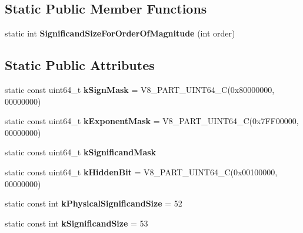 \subsection*{Static Public Member Functions}
\begin{DoxyCompactItemize}
\item 
\hypertarget{classv8_1_1internal_1_1_double_a8ac372d485499fb0e73db067852254c9}{}static int {\bfseries Significand\+Size\+For\+Order\+Of\+Magnitude} (int order)\label{classv8_1_1internal_1_1_double_a8ac372d485499fb0e73db067852254c9}

\end{DoxyCompactItemize}
\subsection*{Static Public Attributes}
\begin{DoxyCompactItemize}
\item 
\hypertarget{classv8_1_1internal_1_1_double_a2a622add63c0f1bd18fee16bfa4da795}{}static const uint64\+\_\+t {\bfseries k\+Sign\+Mask} = V8\+\_\+P\+A\+R\+T\+\_\+\+U\+I\+N\+T64\+\_\+\+C(0x80000000, 00000000)\label{classv8_1_1internal_1_1_double_a2a622add63c0f1bd18fee16bfa4da795}

\item 
\hypertarget{classv8_1_1internal_1_1_double_a9bc757b9cbafdf3183528389566cd821}{}static const uint64\+\_\+t {\bfseries k\+Exponent\+Mask} = V8\+\_\+P\+A\+R\+T\+\_\+\+U\+I\+N\+T64\+\_\+\+C(0x7\+F\+F00000, 00000000)\label{classv8_1_1internal_1_1_double_a9bc757b9cbafdf3183528389566cd821}

\item 
static const uint64\+\_\+t {\bfseries k\+Significand\+Mask}
\item 
\hypertarget{classv8_1_1internal_1_1_double_ab15f4c1adda942586c7cbe1d6fcc3a1e}{}static const uint64\+\_\+t {\bfseries k\+Hidden\+Bit} = V8\+\_\+P\+A\+R\+T\+\_\+\+U\+I\+N\+T64\+\_\+\+C(0x00100000, 00000000)\label{classv8_1_1internal_1_1_double_ab15f4c1adda942586c7cbe1d6fcc3a1e}

\item 
\hypertarget{classv8_1_1internal_1_1_double_af1de6a87841d6548de222fa61d0c2628}{}static const int {\bfseries k\+Physical\+Significand\+Size} = 52\label{classv8_1_1internal_1_1_double_af1de6a87841d6548de222fa61d0c2628}

\item 
\hypertarget{classv8_1_1internal_1_1_double_acc8c3c2f7019f20ae83771473d2c7547}{}static const int {\bfseries k\+Significand\+Size} = 53\label{classv8_1_1internal_1_1_double_acc8c3c2f7019f20ae83771473d2c7547}

\end{DoxyCompactItemize}


